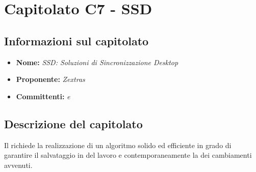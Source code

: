 \section{Capitolato C7 - SSD}
\subsection{Informazioni sul capitolato}
\begin{itemize}
	\item \textbf{Nome:} \textit{SSD: Soluzioni di Sincronizzazione Desktop}
	\item \textbf{Proponente:} \textit{Zextras}
	\item \textbf{Committenti:} \textit{\VT{} e \CR{}}
\end{itemize}

\subsection{Descrizione del capitolato}
Il  richiede la realizzazione di un algoritmo solido ed efficiente in grado di garantire il salvataggio in  del lavoro e contemporaneamente la  dei cambiamenti avvenuti.

